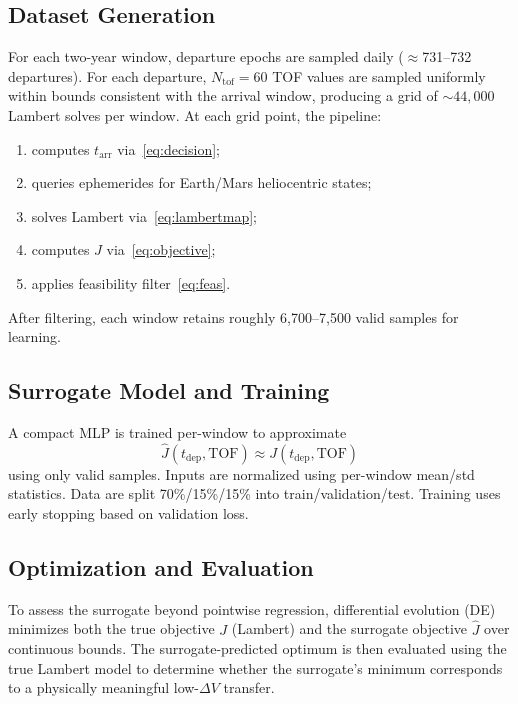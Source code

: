 \documentclass[conference]{IEEEtran}
\begin{document}
	\subsection{Dataset Generation}
	For each two-year window, departure epochs are sampled daily ($\approx$731--732 departures). For each departure, $N_{\mathrm{tof}}=60$ TOF values are sampled uniformly within bounds consistent with the arrival window, producing a grid of $\sim 44{,}000$ Lambert solves per window. At each grid point, the pipeline:
	\begin{enumerate}
		\item computes $t_{\mathrm{arr}}$ via~\eqref{eq:decision};
		\item queries ephemerides for Earth/Mars heliocentric states;
		\item solves Lambert via~\eqref{eq:lambertmap};
		\item computes $J$ via~\eqref{eq:objective};
		\item applies feasibility filter~\eqref{eq:feas}.
	\end{enumerate}
	After filtering, each window retains roughly 6{,}700--7{,}500 valid samples for learning.
	
	\subsection{Surrogate Model and Training}
	A compact MLP is trained per-window to approximate
	\begin{equation}
		\widehat{J}(t_{\mathrm{dep}},\mathrm{TOF}) \approx J(t_{\mathrm{dep}},\mathrm{TOF})
		\label{eq:surr}
	\end{equation}
	using only valid samples. Inputs are normalized using per-window mean/std statistics. Data are split 70\%/15\%/15\% into train/validation/test. Training uses early stopping based on validation loss.
	
	\subsection{Optimization and Evaluation}
	To assess the surrogate beyond pointwise regression, differential evolution (DE) minimizes both the true objective $J$ (Lambert) and the surrogate objective $\widehat{J}$ over continuous bounds. The surrogate-predicted optimum is then evaluated using the true Lambert model to determine whether the surrogate’s minimum corresponds to a physically meaningful low-$\Delta V$ transfer.
	
\end{document}
